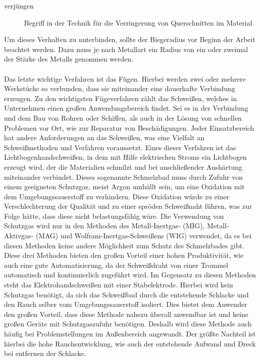 \begin{description}
\item[verjüngen] Begriff in der Technik für die Verringerung von Querschnitten im Material
\end{description}
Um dieses Verhalten zu unterbinden, sollte der Biegeradius vor Beginn der Arbeit beachtet werden. Dazu muss je nach Metallart ein Radius von ein oder zweimal 
der Stärke des Metalls genommen werden.\autocite{Arendes.2023}\\\\
Das letzte wichtige Verfahren ist das Fügen. Hierbei werden zwei oder mehrere Werkstücke so verbunden, dass sie miteinander eine dauerhafte Verbindung 
erzeugen. Zu den wichtigsten Fügeverfahren zählt das Schweißen, welches in Unternehmen einen großen Anwendungsbereich findet. Sei es in der Verbindung 
und dem Bau von Rohren oder Schiffen, als auch in der Lösung von schnellen Problemen vor Ort, wie \zB zur Reparatur von Beschädigungen. Jeder Einsatzbereich 
hat andere Anforderungen an das Schweißen, was eine Vielfalt an Schweißmethoden und Verfahren voraussetzt. Eines dieser Verfahren ist das 
Lichtbogenhandschweißen, in dem mit Hilfe elektrischen Stroms ein Lichtbogen erzeugt wird, der die Materialien schmilzt und bei anschließender 
Aushärtung miteinander verbindet. Dieses sogenannte Schmelzbad muss durch Zufuhr von einem geeigneten Schutzgas, meist Argon umhüllt sein, um eine Oxidation 
mit dem Umgebungssauerstoff zu verhindern. Diese Oxidation würde zu einer Verschlechterung der Qualität und zu einer spröden Schweißnaht führen, was zur 
Folge hätte, dass diese nicht belastungsfähig wäre. Die Verwendung von Schutzgas wird nur in den Methoden des Metall-Inertgas- (MIG), Metall-Aktivgas- (MAG) 
und Wolfram-Inertgas-Schweißens (WIG) verwendet, da es bei diesen Methoden keine andere Möglichkeit zum Schutz des Schmelzbades gibt. Diese drei Methoden 
bieten den großen Vorteil einer hohen Produktivität, wie auch eine gute Automatisierung, da der Schweißdraht von einer Trommel automatisch und kontinuierlich 
zugeführt wird. Im Gegensatz zu diesen Methoden steht das Elektrohandschweißen mit einer Stabelektrode. Hierbei wird kein Schutzgas benötigt, da sich das 
Schweißbad durch die entstehende Schlacke und den Rauch selber vom Umgebungssauerstoff isoliert. Dies bietet dem Anwender den großen Vorteil, dass diese 
Methode nahezu überall anwendbar ist und keine großen Geräte mit Schutzgaszufuhr benötigen. Deshalb wird diese Methode auch häufig bei Problemstellungen 
im Außenbereich angewandt. Der größte Nachteil ist hierbei die hohe Rauchentwicklung, wie auch der entstehende Aufwand und Dreck bei entfernen der Schlacke. 
